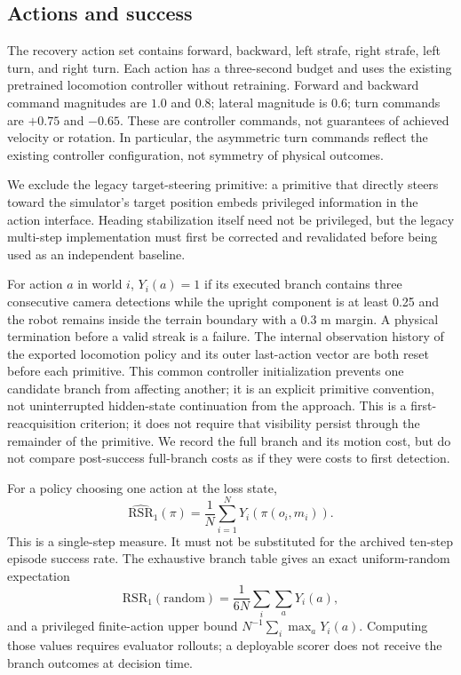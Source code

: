 \documentclass[10pt,twocolumn,a4paper]{article}
\begin{document}
\subsection{Actions and success}
The recovery action set contains forward, backward, left strafe, right strafe, left turn, and right turn. Each action has a three-second budget and uses the existing pretrained locomotion controller without retraining. Forward and backward command magnitudes are $1.0$ and $0.8$; lateral magnitude is $0.6$; turn commands are $+0.75$ and $-0.65$. These are controller commands, not guarantees of achieved velocity or rotation. In particular, the asymmetric turn commands reflect the existing controller configuration, not symmetry of physical outcomes.

We exclude the legacy target-steering primitive: a primitive that directly steers toward the simulator's target position embeds privileged information in the action interface. Heading stabilization itself need not be privileged, but the legacy multi-step implementation must first be corrected and revalidated before being used as an independent baseline.

For action $a$ in world $i$, $Y_i(a)=1$ if its executed branch contains three consecutive camera detections while the upright component is at least 0.25 and the robot remains inside the terrain boundary with a 0.3 m margin. A physical termination before a valid streak is a failure. The internal observation history of the exported locomotion policy and its outer last-action vector are both reset before each primitive. This common controller initialization prevents one candidate branch from affecting another; it is an explicit primitive convention, not uninterrupted hidden-state continuation from the approach. This is a first-reacquisition criterion; it does not require that visibility persist through the remainder of the primitive. We record the full branch and its motion cost, but do not compare post-success full-branch costs as if they were costs to first detection.

For a policy choosing one action at the loss state,
\begin{equation}
\widehat{\mathrm{RSR}}_1(\pi)=\frac{1}{N}\sum_{i=1}^{N}Y_i(\pi(o_i,m_i)).
\end{equation}
This is a single-step measure. It must not be substituted for the archived ten-step episode success rate. The exhaustive branch table gives an exact uniform-random expectation
\begin{equation}
\widehat{\mathrm{RSR}}_1(\mathrm{random})=\frac{1}{6N}\sum_i\sum_aY_i(a),
\end{equation}
and a privileged finite-action upper bound $N^{-1}\sum_i\max_aY_i(a)$. Computing those values requires evaluator rollouts; a deployable scorer does not receive the branch outcomes at decision time.
\end{document}
